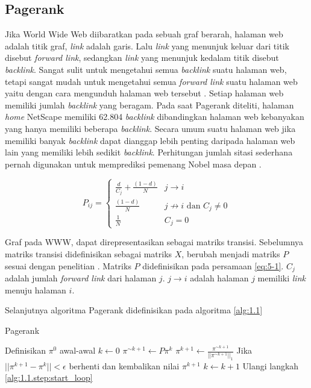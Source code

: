 \documentclass[
	a4paper, %
	12pt, %
	unnumberedsections, %
	twoside, %
]{LTJournalArticle}
\begin{document}
\subsection{Pagerank}

Jika World Wide Web diibaratkan pada sebuah graf berarah, halaman web adalah titik graf, \textit{link} adalah garis. Lalu \textit{link} yang menunjuk keluar dari titik disebut \textit{forward link}, sedangkan \textit{link} yang menunjuk kedalam titik disebut \textit{backlink}. Sangat sulit untuk mengetahui semua \textit{backlink} suatu halaman web, tetapi sangat mudah untuk mengetahui semua \textit{forward link} suatu halaman web yaitu dengan cara mengunduh halaman web tersebut \citep{ilprints422}. Setiap halaman web memiliki jumlah \textit{backlink} yang beragam. Pada saat Pagerank diteliti, halaman \textit{home} NetScape memiliki 62.804 \textit{backlink} dibandingkan halaman web kebanyakan yang hanya memiliki beberapa \textit{backlink}. Secara umum suatu halaman web jika memiliki banyak \textit{backlink} dapat dianggap lebih penting daripada halaman web lain yang memiliki lebih sedikit \textit{backlink}. Perhitungan jumlah sitasi sederhana pernah digunakan untuk memprediksi pemenang Nobel masa depan \citep{ilprints422}. 

\begin{equation}
	\label{eq:5-1}
	P_{ij}= 
	\begin{cases}
		\frac{d}{C_j} + \frac{(1-d)}{N} & j \to i \\
		\frac{(1-d)}{N} & j \not\to i \text{ dan } C_j \not=0 \\
		\frac{1}{N} & C_j = 0
	\end{cases}
\end{equation}

Graf pada WWW, dapat direpresentasikan sebagai matriks transisi. Sebelumnya matriks transisi didefinisikan sebagai matriks $X$, berubah menjadi matriks $P$ sesuai dengan penelitian \citet{zhuetal2005distributedPagerank}. Matriks $P$ didefinisikan pada persamaan \ref{eq:5-1}. $C_j$ adalah jumlah \textit{forward link} dari halaman $j$. $j \to i$ adalah halaman $j$ memiliki \textit{link} menuju halaman $i$.

Selanjutnya algoritma Pagerank didefinisikan pada algoritma \ref{alg:1.1}

\begin{algorithm}
	\caption{Pagerank \citep{zhuetal2005distributedPagerank}}
	\label{alg:1.1}
	\begin{algorithmic}[1]
		\State Definisikan $\pi^0$ awal-awal
		\State $k \gets 0$
		\State \label{alg:1.1.step:start_loop} $\pi^{\sim k+1} \gets P \pi^k$
		\State $\pi^{k+1} \gets \frac{\pi^{\sim k+1}}{||\pi^{\sim k+1}||_1}$
		\State Jika $||\pi^{k+1} - \pi^k|| < \epsilon$  berhenti dan kembalikan nilai $\pi^{k+1}$
		\State $k \gets k+1$
		\State Ulangi langkah \ref{alg:1.1.step:start_loop}
	\end{algorithmic}
\end{algorithm}
\end{document}
